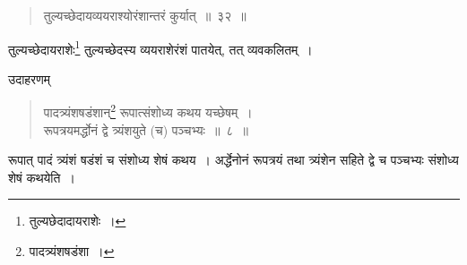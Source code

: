 \documentclass[10pt, openany]{book}
\begin{document}
\vspace{0.2cm}{भिन्नव्यवकलिते करणसूत्रमार्यापरार्द्धम्\textemdash} 

\begin{quote}
 {\bs तुल्यच्छेदायव्ययराश्योरंशान्तरं कुर्यात्~॥~३२~॥}\end{quote}

{तुल्यच्छेदायराशेः\renewcommand{\thefootnote}{\s ७}\footnote{\s तुल्यछेदादायराशेः~।}  तुल्यच्छेदस्य व्ययराशेरंशं पातयेत्, तत् व्यवकलितम्~।}
\vspace{2mm}

{उदाहरणम्\textemdash}

\begin{quote}
    
 \label{32}
{\eg  पादत्र्यंशषडंशान्\renewcommand{\thefootnote}{८}\footnote{पादत्र्यंशषडंशा~।}  रूपात्संशोध्य कथय यच्छेषम्~। \\
 रूपत्रयमर्द्धोनं द्वे त्र्यंशयुते (च) पञ्चभ्यः~॥~८~॥} \end{quote}

{रूपात् पादं त्र्यंशं षडंशं च संशोध्य शेषं कथय~। अर्द्धेनोनं रूपत्रयं
तथा त्र्यंशेन सहिते}
{द्वे च पञ्चभ्यः संशोध्य शेषं कथयेति~।}
\vspace{2mm}
\end{document}
